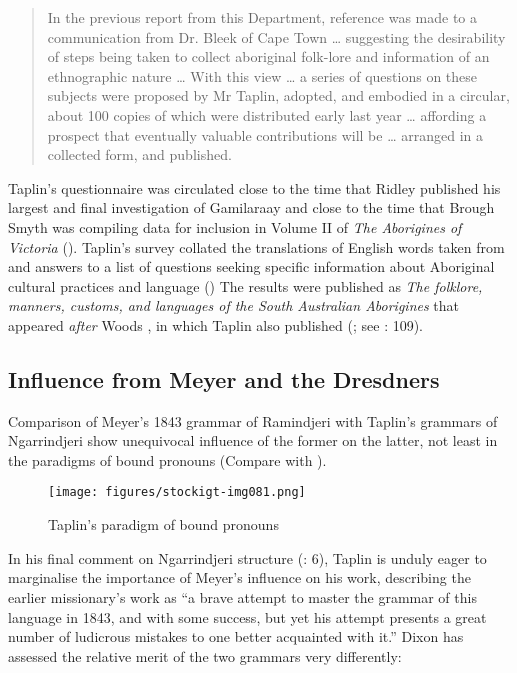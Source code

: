 \begin{quote}
In the previous report from this Department, reference was made to a communication from Dr. Bleek of Cape Town … suggesting the desirability of steps being taken to collect aboriginal folk-lore and information of an ethnographic nature … With this view … a series of questions on these subjects were proposed by Mr Taplin, adopted, and embodied in a circular, about 100 copies of which were distributed early last year … affording a prospect that eventually valuable contributions will be … arranged in a collected form, and published.
\end{quote}

Taplin’s questionnaire was circulated close to the time that Ridley published his largest and final investigation of Gamilaraay \citeyearpar{taplin_report_1875} and close to the time that Brough Smyth was compiling data for inclusion in Volume II of \textit{The Aborigines of Victoria} (\citeyear{smyth_aborigines_1878}). Taplin’s survey collated the translations of English words taken from \citet{turner_nineteen_1861} and answers to a list of questions seeking specific information about Aboriginal cultural practices and language () The results were published as \textit{The folklore, manners, customs, and languages of the South Australian Aborigines} \citeyearpar{taplin_1879a_nodate} that appeared \textit{after} Woods \citeyearpar{taplin_1879a_nodate}, in which Taplin also published (\citealt{taplin_narrinyeri_1879}; see \citealt{taplin_1879a_nodate}: 109).

\subsection{Influence from Meyer \citeyearpar{meyer_vocabulary_1843} and the Dresdners}
\label{sec:key:7.3.2}\label{bkm:Ref336429071}

Comparison of Meyer’s 1843 grammar of Ramindjeri with Taplin’s grammars of Ngarrindjeri show unequivocal influence of the former on the latter, not least in the paradigms of bound pronouns (Compare  with ).


\begin{figure}
\texttt{[image: figures/stockigt-img081.png]}
\caption{Taplin’s paradigm of bound pronouns \citeyearpar[86]{taplin_notes_1872}}
\label{bkm:Ref456016370}\label{fig:key:7-134}
\end{figure}

In his final comment on Ngarrindjeri structure (\citeyear{taplin_grammar_1878}: 6), Taplin is unduly eager to marginalise the importance of Meyer’s influence on his work, describing the earlier missionary’s work as “a brave attempt to master the grammar of this language in 1843, and with some success, but yet his attempt presents a great number of ludicrous mistakes to one better acquainted with it.” Dixon has assessed the relative merit of the two grammars very differently:

